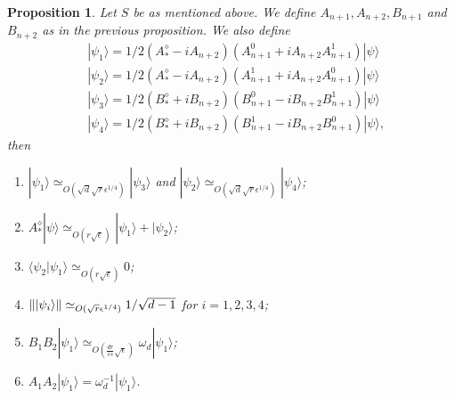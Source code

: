\documentclass[11pt,letterpaper]{article}
\newcommand{\ket}[1]{|#1\rangle}
\newcommand{\braket}[2]{\langle#1|#2\rangle}
\DeclarePairedDelimiter{\norm}{\lVert}{\rVert}
\newcommand{\1}{\mathbb{1}}
\newcommand{\se}{\sqrt{\epsilon}}
\newcommand{\qe}{\epsilon^{1/4}}
\newcommand{\sd}{\sqrt{d}}
\newcommand{\sr}{\sqrt{r}}
\newcommand{\appd}[1]{\simeq_{#1}}
\newtheorem{proposition}[theorem]{Proposition}
\theoremstyle{definition}
\begin{document}
\begin{proposition}
	Let $S$ be as mentioned above. We define $A_{n+1}, A_{n+2},B_{n+1}$ and $B_{n+2}$ as in the previous proposition.
	We also define
	\begin{align}
		&\ket{\psi_1} =1/2 (A_\ast^\diamond - iA_{n+2})(A_{n+1}^0 + iA_{n+2}A_{n+1}^1) \ket{\psi} \\
		&\ket{\psi_2} = 1/2 (A_\ast^\diamond - iA_{n+2})(A_{n+1}^1 + iA_{n+2}A_{n+1}^0) \ket{\psi} \\
		&\ket{\psi_3} =1/2 (B_\ast^\diamond + i B_{n+2})(B_{n+1}^0 - iB_{n+2}B_{n+1}^1) \ket{\psi}  \\
		&\ket{\psi_4} =1/2 (B_\ast^\diamond + i B_{n+2})(B_{n+1}^1 - iB_{n+2}B_{n+1}^0) \ket{\psi},
	\end{align}
	then
	\begin{enumerate}
	\item $\ket{\psi_1} \appd{O(\sd \sr\qe)} \ket{\psi_3}$ and $\ket{\psi_2} \appd{O(\sd \sr\qe)} \ket{\psi_4}$; 
	\item $A_\ast^\diamond \ket{\psi} \appd{O( r\se)} \ket{\psi_1}+\ket{\psi_2}$;
	\item $\braket{\psi_2}{\psi_1} \appd{O( r\se)} 0$;
	\item $\norm{\ket{\psi_i}} \appd{O(\sr\qe)} 1/\sqrt{d-1}$ for $i = 1, 2, 3, 4$;
	\item $B_1B_2 \ket{\psi_1} \appd{O(\frac{dr}{cs}\se)} \omega_d\ket{\psi_1}$;
	\item $A_1A_2 \ket{\psi_1} = \omega_d^{-1} \ket{\psi_1}$.
	\end{enumerate}
\end{proposition}
\end{document}

